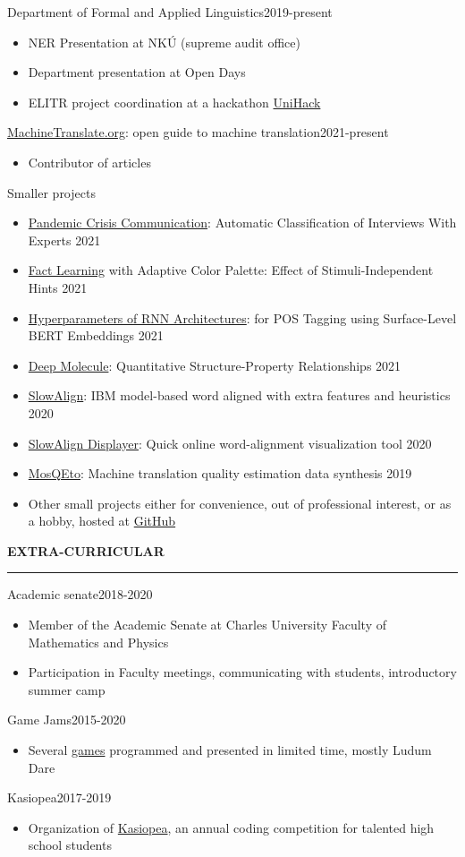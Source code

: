 \documentclass[11pt,a4paper]{article} %
\newcommand{\hSection}[1]{
    \medskip
    \MakeUppercase{\bf #1}
    \medskip
    \hrule
}
\newcommand{\hSubsectionItemize}[3]{
    {#1}\hfill {\footnotesize #2}\hspace{-1cm}\\
    \vspace{-0.5cm}
    \begin{itemize} \footnotesize #3 \end{itemize}
    \vspace{0.3\baselineskip}
}
\begin{document}
\hSubsectionItemize
{Department of Formal and Applied Linguistics}
{2019-present}
{
\item NER Presentation at NKÚ (supreme audit office)
\item Department presentation at Open Days
\item ELITR project coordination at a hackathon \href{https://elitr.eu/unihack-2020/}{UniHack}
}

\hSubsectionItemize
{\href{https://www.machinetranslate.org}{MachineTranslate.org}: open guide to machine translation}
{2021-present}
{
\item Contributor of articles
}

\hSubsectionItemize
{Smaller projects}
{}
{
\item \href{https://github.com/zouharvi/multichannel-management}{Pandemic Crisis Communication}: Automatic Classification of Interviews With Experts \hfill {2021}
\item \href{https://github.com/zouharvi/user-models}{Fact Learning} with Adaptive Color Palette: Effect of Stimuli-Independent Hints \hfill {2021}
\item \href{https://github.com/zouharvi/rnn-bert-pos}{Hyperparameters of RNN Architectures}: for POS Tagging using Surface-Level BERT Embeddings \hfill {2021}
\item \href{https://github.com/zouharvi/deep-molecule-qspr}{Deep Molecule}: Quantitative Structure-Property Relationships \hfill {2021}
\item \href{https://github.com/zouharvi/SlowAlign}{SlowAlign}: 
IBM model-based word aligned with extra features and heuristics \hfill{2020}
\item \href{https://vilda.net/s/slowalign/}{SlowAlign Displayer}: Quick online word-alignment visualization tool \hfill {2020}
\item \href{https://github.com/zouharvi/MosQEto}{MosQEto}: Machine translation quality estimation data synthesis \hfill {2019}
\item Other small projects either for convenience, out of professional interest, or as a hobby, hosted at \href{https://github.com/zouharvi}{GitHub}
}


\hSection{Extra-Curricular}
\hSubsectionItemize
{Academic senate}
{2018-2020}
{
\item Member of the Academic Senate at Charles University Faculty of Mathematics and Physics
\item Participation in Faculty meetings, communicating with students, introductory summer camp 
}

\hSubsectionItemize
{Game Jams}
{2015-2020}
{
\item Several \href{https://github.com/allemansratten}{games} programmed and presented in limited time, mostly Ludum Dare
}

\hSubsectionItemize
{Kasiopea}
{2017-2019}
{
\item Organization of \href{https://kasiopea.matfyz.cz/}{Kasiopea}, an annual coding competition for talented high school students
}
\end{document}
